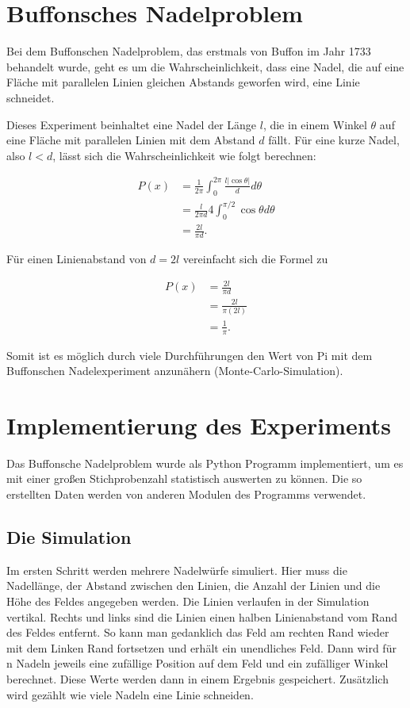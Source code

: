 \documentclass[10pt,twocolumn]{scrartcl}
\begin{document}
\section{Buffonsches Nadelproblem}
	\label{chap_buffon_needle}
	Bei dem Buffonschen Nadelproblem, das erstmals von Buffon im Jahr 1733 behandelt wurde, geht es um die Wahrscheinlichkeit, dass eine Nadel, die auf eine Fläche mit parallelen Linien gleichen Abstands geworfen wird, eine Linie schneidet.
	
	Dieses Experiment beinhaltet eine Nadel der Länge $l$, die in einem Winkel $\theta$ auf eine Fläche mit parallelen Linien mit dem Abstand $d$ fällt. Für eine kurze Nadel, also $l < d$, lässt sich die Wahrscheinlichkeit wie folgt berechnen: \cite{MathWorld}

	\begin{align}
		P(x) &= \frac{1}{2\pi}\int_{0}^{2\pi}\frac{l|\cos{\theta}|}{d}d\theta \\ 
		&= \frac{l}{2 \pi d} 4 \int_{0}^{\pi/2}\cos{\theta}d\theta  \nonumber \\
		&= \frac{2l}{\pi d} \nonumber .
	\end{align}
	
	Für einen Linienabstand von $d=2l$ vereinfacht sich die Formel zu
	
	\begin{align}
		P(x) &= \frac{2l}{\pi d} \nonumber \\ 
		&= \frac{2l}{\pi (2l)} \nonumber \\
		&= \frac{1}{\pi} .
	\end{align}
	
	Somit ist es möglich durch viele Durchführungen den Wert von Pi mit dem Buffonschen Nadelexperiment anzunähern (Monte-Carlo-Simulation).

\section{Implementierung des Experiments}
	Das Buffonsche Nadelproblem wurde als Python\cite{Python} Programm implementiert, um es mit einer großen Stichprobenzahl statistisch auswerten zu können. Die so erstellten Daten werden von anderen Modulen des Programms verwendet.

	\subsection{Die Simulation}
		\label{chap_sim_results}
		Im ersten Schritt werden mehrere Nadelwürfe simuliert. Hier muss die Nadellänge, der Abstand zwischen den Linien, die Anzahl der Linien und die Höhe des Feldes angegeben werden. Die Linien verlaufen in der Simulation vertikal. Rechts und links sind die Linien einen halben Linienabstand vom Rand des Feldes entfernt. So kann man gedanklich das Feld am rechten Rand wieder mit dem Linken Rand fortsetzen und erhält ein unendliches Feld. Dann wird für n Nadeln jeweils eine zufällige Position auf dem Feld und ein zufälliger Winkel berechnet. Diese Werte werden dann in einem Ergebnis gespeichert. Zusätzlich wird gezählt wie viele Nadeln eine Linie schneiden.
\end{document}
